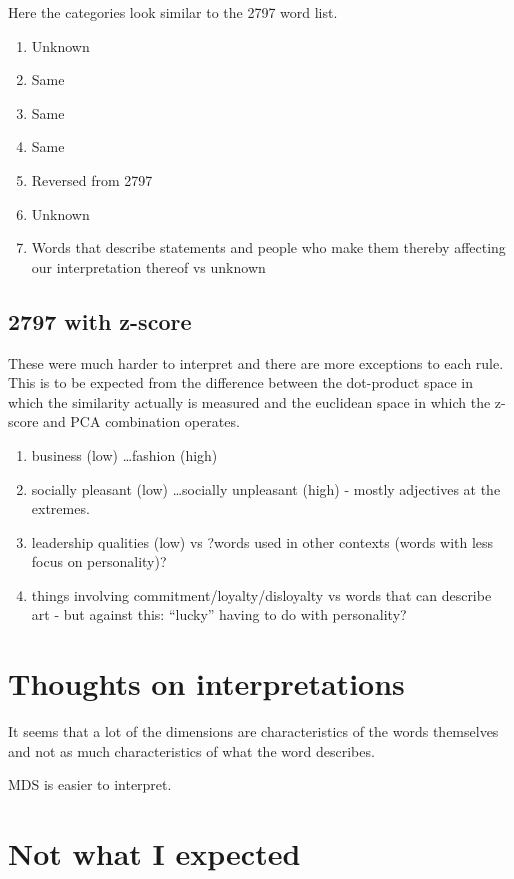 \documentclass[eric_thesis.tex]{subfiles}
\begin{document}
Here the categories look similar to the 2797 word list. 

\begin{enumerate}
 \item Unknown
 \item Same
 \item Same
 \item Same
 \item Reversed from 2797
 \item Unknown
 \item Words that describe statements and people who make them thereby 
       affecting our interpretation thereof vs unknown
\end{enumerate}

\subsection{2797 with z-score}

These were much harder to interpret and there are more exceptions to each rule. 
This is to be expected from the difference between the dot-product space in 
which the similarity actually is measured and the euclidean space in which the 
z-score and PCA combination operates.

\begin{enumerate}
 \item business (low) \ldots fashion (high)
 \item socially pleasant (low) \ldots socially unpleasant (high) - mostly 
adjectives at the extremes.
 \item leadership qualities (low) vs ?words used in other contexts (words with 
less focus on personality)?
 \item things involving commitment/loyalty/disloyalty vs words that can 
describe art - but against this: ``lucky'' having to do with personality?
\end{enumerate}

\section{Thoughts on interpretations}

It seems that a lot of the dimensions are characteristics of the words 
themselves and not as much characteristics of what the word describes.

MDS is easier to interpret.




\section{Not what I expected}
\end{document}
